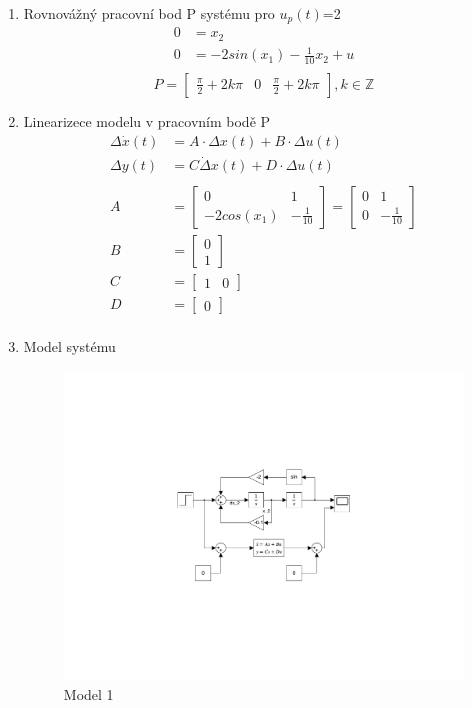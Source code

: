 \documentclass{article}
\newcommand\mat[1]{\begin{bmatrix}#1\end{bmatrix}}
\begin{document}
\begin{enumerate}
    \item Rovnovážný pracovní bod P systému pro $u_p(t)$=2
    \begin{align*}
        0 &= x_2\\
        0 &= -2 sin(x_1) - \frac{1}{10}x_2+u\\
    \end{align*}
    \[P = \mat{\frac{\pi}{2}+2k\pi & 0 & \frac{\pi}{2}+2k\pi}, k \in \mathbb{Z}\]

    \item Linearizece modelu v pracovním bodě P
    \begin{align*}
        \Delta \dot x(t) &= A \cdot \Delta x(t) + B \cdot \Delta u(t)\\
        \Delta y(t) &= C \dot \Delta x(t) + D \cdot \Delta u(t)\\
        \\
        A &= \mat{0 & 1\\ -2cos(x_1) & -\frac{1}{10}} = \mat{0 & 1 \\ 0 & -\frac{1}{10}}\\
        B &= \mat{0\\1}\\
        C &= \mat{1 & 0}\\
        D &= \mat{0}\\
    \end{align*}


    \item Model systému
        \begin{figure}[H]
        \centering
        \includegraphics[clip,trim=6.1cm 6.8cm 6.1cm 6.8cm, width=1.00\textwidth]{ARI_HW_0.pdf}
        \caption{Model 1}
    \end{figure}



\end{enumerate}
\end{document}
